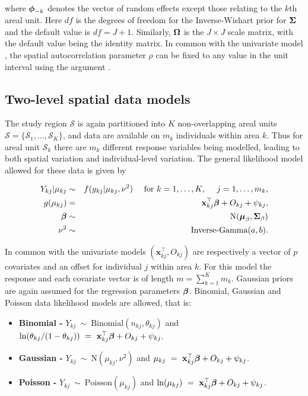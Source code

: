 \documentclass[article,shortnames,nojss]{jss}
\newcommand{\bd}[1]{\ensuremath{\mbox{\boldmath $#1$}}}
\begin{document}
where $\bd{\phi}_{-k}$ denotes the vector of random effects except those relating to the $k$th areal unit. Here $df$ is the degrees of freedom for the Inverse-Wishart prior for $\bd{\Sigma}$ and the default value is $df=J+1$. Similarly,  $\bd{\Omega}$ is the $J\times J$ scale matrix, with the default value being the identity matrix. In common with the univariate model , the spatial autocorrelation parameter $\rho$ can be fixed to any value in the unit interval using the argument .





\subsection{Two-level spatial data models}
The study region $\mathcal{S}$ is again partitioned into $K$ non-overlapping areal units $\mathcal{S}=\{\mathcal{S}_{1},\ldots,\mathcal{S}_{K}\}$, and data are available on $m_{k}$ individuals within area $k$. Thus for areal unit $\mathcal{S}_{k}$ there are $m_{k}$ different response variables being modelled, leading to both spatial variation and individual-level variation. The general likelihood model allowed for these data is given by

\begin{eqnarray}
Y_{kj}|\mu_{kj}&\sim&f(y_{kj}|\mu_{kj}, \nu^2)~~~~\mbox{for }k=1,\ldots,K,~~~~ j=1,\ldots,m_k,\label{equation two level likelihood}\\
g(\mu_{kj})&=& \mathbf{x}_{kj}^{\top}\bd{\beta} + O_{kj} + \psi_{kj} ,\nonumber\\
\bd{\beta}&\sim&\mbox{N}(\bd{\mu}_{\beta}, \bd{\Sigma}_{\beta})\nonumber\\
\nu^2 &\sim& \mbox{Inverse-Gamma}(a,b).\nonumber
\end{eqnarray}

In common with the univariate models $(\mathbf{x}_{kj}^{\top}, O_{kj})$ are respectively a vector of $p$ covariates and an offset for individual $j$ within area $k$. For this model the response and each covariate vector is of length $m=\sum_{k=1}^{K}m_k$. Gaussian priors are again assumed for the regression parameters $\bd{\beta}$. Binomial, Gaussian and Poisson data likelihood models are allowed, that is:

\begin{itemize}
\item \textbf{Binomial - } $Y_{kj}~\sim~\mbox{Binomial}(n_{kj}, \theta_{kj})$ and $\ln(\theta_{kj}/(1-\theta_{kj}))~=~\mathbf{x}_{kj}^{\top}\bd{\beta} + O_{kj} + \psi_{kj}$. 

\item \textbf{Gaussian - } $Y_{kj}~\sim~\mbox{N}(\mu_{kj}, \nu^{2})$ and $\mu_{kj}~=~\mathbf{x}_{kj}^{\top}\bd{\beta} + O_{kj} + \psi_{kj}$.

\item \textbf{Poisson - } $Y_{kj}~\sim~\mbox{Poisson}(\mu_{kj})$ and $\ln(\mu_{kj})~=~\mathbf{x}_{kj}^{\top}\bd{\beta} + O_{kj} + \psi_{kj}$. 
\end{itemize}
\end{document}
